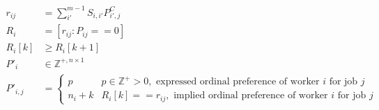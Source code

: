 \begin{align*}
r_{ij} &= \sum_{i'}^{m-1}S_{i,i'} P^C_{i',j} \\
R_i &= [r_{ij}: P_{ij} == 0] \\
R_i[k] & \geq R_i[k+1] \\
P'_i & \in \mathbb{Z}^{+, n \times 1} \\
P'_{i,j} &= \begin{cases}
p & p \in \mathbb{Z}^+ > 0, \text{ expressed ordinal preference of worker $i$ for job $j$}\\
n_i + k & R_i[k] == r_{ij}, \text{ implied ordinal preference of worker $i$ for job $j$}
\end{cases} \\
\end{align*}